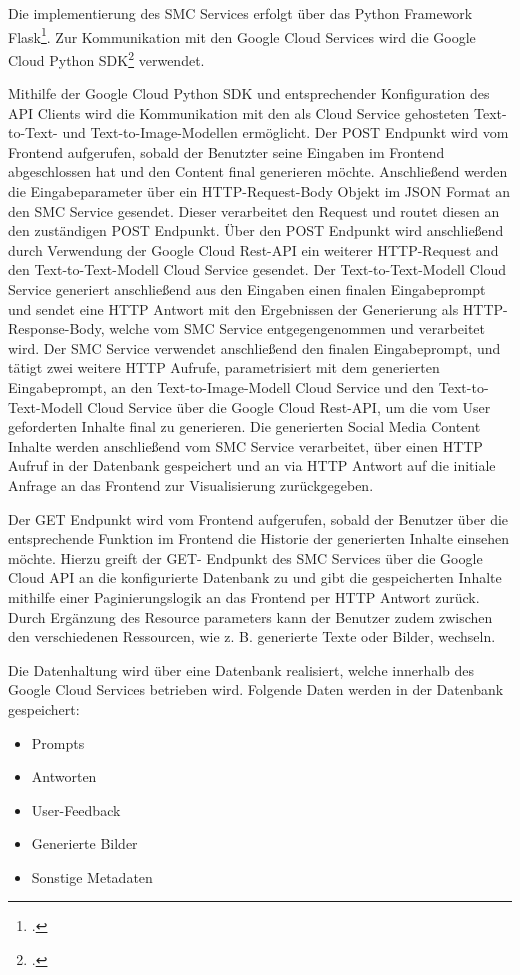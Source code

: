 Die implementierung des SMC Services erfolgt über das Python Framework Flask\footcite{flask}.
Zur Kommunikation mit den Google Cloud Services wird die Google Cloud Python SDK\footcite{google_cloud_sdk} verwendet.

Mithilfe der Google Cloud Python SDK und entsprechender Konfiguration des API Clients wird die Kommunikation mit den als Cloud Service gehosteten Text-to-Text- und Text-to-Image-Modellen ermöglicht.
Der POST Endpunkt wird vom Frontend aufgerufen, sobald der Benutzter seine Eingaben im Frontend abgeschlossen hat und den Content final generieren möchte.
Anschließend werden die Eingabeparameter über ein HTTP-Request-Body Objekt im JSON Format an den SMC Service gesendet.
Dieser verarbeitet den Request und routet diesen an den zuständigen POST Endpunkt.
Über den POST Endpunkt wird anschließend durch Verwendung der Google Cloud Rest-API ein weiterer HTTP-Request and den Text-to-Text-Modell Cloud Service gesendet.
Der Text-to-Text-Modell Cloud Service generiert anschließend aus den Eingaben einen finalen Eingabeprompt und sendet eine HTTP Antwort mit den Ergebnissen der Generierung als HTTP-Response-Body, welche vom SMC Service entgegengenommen und verarbeitet wird.
Der SMC Service verwendet anschließend den finalen Eingabeprompt, und tätigt zwei weitere HTTP Aufrufe, parametrisiert mit dem generierten Eingabeprompt, an den Text-to-Image-Modell Cloud Service und den Text-to-Text-Modell Cloud Service über die Google Cloud Rest-API, um die vom User geforderten Inhalte final zu generieren.
Die generierten Social Media Content Inhalte werden anschließend vom SMC Service verarbeitet, über einen HTTP Aufruf in der Datenbank gespeichert und an via HTTP Antwort auf die initiale Anfrage an das Frontend zur Visualisierung zurückgegeben.

Der GET Endpunkt wird vom Frontend aufgerufen, sobald der Benutzer über die entsprechende Funktion im Frontend die Historie der generierten Inhalte einsehen möchte.
Hierzu greift der GET- Endpunkt des SMC Services über die Google Cloud API an die konfigurierte Datenbank zu und gibt die gespeicherten Inhalte mithilfe einer Paginierungslogik an das Frontend per HTTP Antwort zurück.
Durch Ergänzung des Resource parameters kann der Benutzer zudem zwischen den verschiedenen Ressourcen, wie z. B. generierte Texte oder Bilder, wechseln.

Die Datenhaltung wird über eine Datenbank realisiert, welche innerhalb des Google Cloud Services betrieben wird.
Folgende Daten werden in der Datenbank gespeichert:
\begin{itemize}
    \item Prompts
    \item Antworten
    \item User-Feedback
    \item Generierte Bilder
    \item Sonstige Metadaten
\end{itemize}

